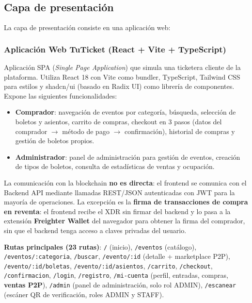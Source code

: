 \documentclass[12pt,oneside]{article}
\begin{document}
\subsection{Capa de presentación}

La capa de presentación consiste en una aplicación web:

\subsubsection{Aplicación Web TuTicket (React + Vite + TypeScript)}

Aplicación SPA (\textit{Single Page Application}) que simula una ticketera cliente de la plataforma. Utiliza React 18 con Vite como bundler, TypeScript, Tailwind CSS para estilos y shadcn/ui (basado en Radix UI) como librería de componentes. Expone las siguientes funcionalidades:

\begin{itemize}
  \item \textbf{Comprador}: navegación de eventos por categoría, búsqueda, selección de boletos y asientos, carrito de compras, checkout en 3 pasos (datos del comprador $\rightarrow$ método de pago $\rightarrow$ confirmación), historial de compras y gestión de boletos propios.
  \item \textbf{Administrador}: panel de administración para gestión de eventos, creación de tipos de boletos, consulta de estadísticas de ventas y ocupación.
\end{itemize}

La comunicación con la blockchain \textbf{no es directa}: el frontend se comunica con el Backend API mediante llamadas REST/JSON autenticadas con JWT para la mayoría de operaciones. La excepción es la \textbf{firma de transacciones de compra en reventa}: el frontend recibe el XDR sin firmar del backend y lo pasa a la extensión \textbf{Freighter Wallet} del navegador para obtener la firma del comprador, sin que el backend tenga acceso a claves privadas del usuario.

\textbf{Rutas principales (23 rutas)}: \texttt{/} (inicio), \texttt{/eventos} (catálogo), \texttt{/eventos/:categoria}, \texttt{/buscar}, \texttt{/evento/:id} (detalle + marketplace P2P), \texttt{/evento/:id/boletas}, \texttt{/evento/:id/asientos}, \texttt{/carrito}, \texttt{/checkout}, \texttt{/confirmacion}, \texttt{/login}, \texttt{/registro}, \texttt{/mi-cuenta} (perfil, entradas, compras, \textbf{ventas P2P}), \texttt{/admin} (panel de administración, solo rol ADMIN), \texttt{/escanear} (escáner QR de verificación, roles ADMIN y STAFF).
\end{document}

